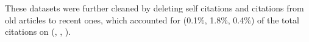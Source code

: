 These datasets were further cleaned by deleting self citations and citations from old articles to recent ones, which accounted for (0.1\%, 1.8\%, 0.4\%) of the total citations on (\aan, \aminer, \magdata).









